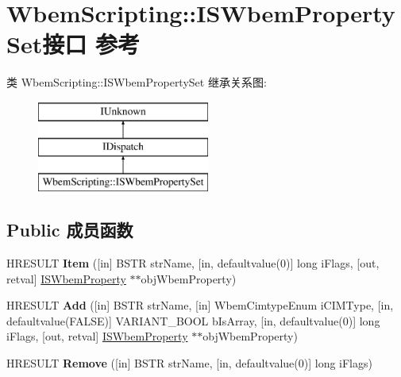 \hypertarget{interface_wbem_scripting_1_1_i_s_wbem_property_set}{}\section{Wbem\+Scripting\+:\+:I\+S\+Wbem\+Property\+Set接口 参考}
\label{interface_wbem_scripting_1_1_i_s_wbem_property_set}
类 Wbem\+Scripting\+:\+:I\+S\+Wbem\+Property\+Set 继承关系图\+:\begin{figure}[H]
\begin{center}
\leavevmode
\includegraphics[height=3.000000cm]{interface_wbem_scripting_1_1_i_s_wbem_property_set}
\end{center}
\end{figure}
\subsection*{Public 成员函数}
\begin{DoxyCompactItemize}
\item 
\mbox{\label{interface_wbem_scripting_1_1_i_s_wbem_property_set_aed452041c59a60b3c16decdd3681eb5f}} 
H\+R\+E\+S\+U\+LT {\bfseries Item} (\mbox{[}in\mbox{]} B\+S\+TR str\+Name, \mbox{[}in, defaultvalue(0)\mbox{]} long i\+Flags, \mbox{[}out, retval\mbox{]} \hyperlink{interface_wbem_scripting_1_1_i_s_wbem_property}{I\+S\+Wbem\+Property} $\ast$$\ast$obj\+Wbem\+Property)
\item 
\mbox{\label{interface_wbem_scripting_1_1_i_s_wbem_property_set_a1d97529256630ebb1d2131c0975fa5a3}} 
H\+R\+E\+S\+U\+LT {\bfseries Add} (\mbox{[}in\mbox{]} B\+S\+TR str\+Name, \mbox{[}in\mbox{]} Wbem\+Cimtype\+Enum i\+C\+I\+M\+Type, \mbox{[}in, defaultvalue(F\+A\+L\+SE)\mbox{]} V\+A\+R\+I\+A\+N\+T\+\_\+\+B\+O\+OL b\+Is\+Array, \mbox{[}in, defaultvalue(0)\mbox{]} long i\+Flags, \mbox{[}out, retval\mbox{]} \hyperlink{interface_wbem_scripting_1_1_i_s_wbem_property}{I\+S\+Wbem\+Property} $\ast$$\ast$obj\+Wbem\+Property)
\item 
\mbox{\label{interface_wbem_scripting_1_1_i_s_wbem_property_set_ac5f5fd0bc8a8937af7cf27edbc657861}} 
H\+R\+E\+S\+U\+LT {\bfseries Remove} (\mbox{[}in\mbox{]} B\+S\+TR str\+Name, \mbox{[}in, defaultvalue(0)\mbox{]} long i\+Flags)
\end{DoxyCompactItemize}
